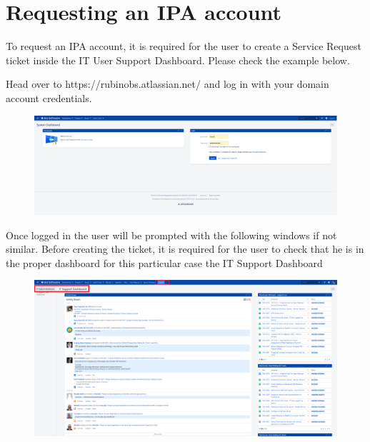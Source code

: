 \section{Requesting an IPA account}
\label{sec:IPA}

  To request an IPA account, it is required for the user to create a Service Request ticket inside the IT User Support Dashboard.
  Please check the example below.

  Head over to https://rubinobs.atlassian.net/ and log in with your domain account credentials.

\vspace{5 mm}

\begin{figure}
  \includegraphics[width=12cm]{Images/example1.png}
\end{figure}

\vspace{5 mm}

Once logged in the user will be prompted with the following windows if not similar. Before creating the ticket,  it is required for the user to check that he is in the proper dashboard for this particular case the IT Support Dashboard

\vspace{5 mm}

\begin{figure}
  \includegraphics[width=12cm]{Images/example2.png}
\end{figure}

\vspace{40 mm}


